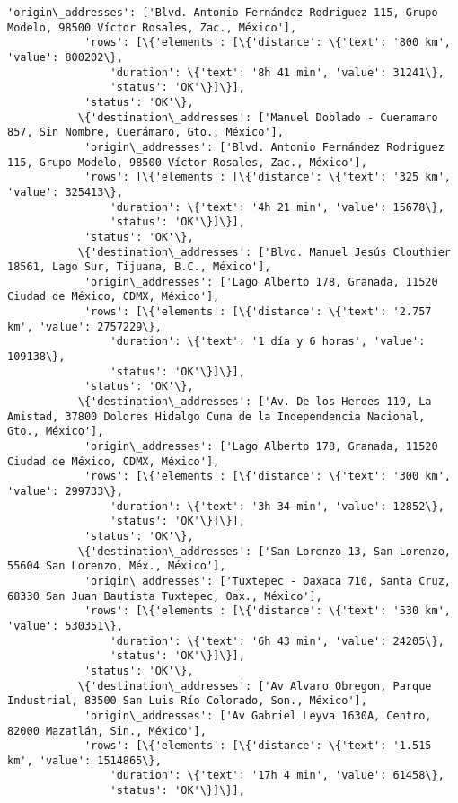 \documentclass[11pt]{article}
\begin{document}
\begin{Verbatim}[commandchars=\\\{\}]
            'origin\_addresses': ['Blvd. Antonio Fernández Rodriguez 115, Grupo Modelo, 98500 Víctor Rosales, Zac., México'],
            'rows': [\{'elements': [\{'distance': \{'text': '800 km', 'value': 800202\},
                'duration': \{'text': '8h 41 min', 'value': 31241\},
                'status': 'OK'\}]\}],
            'status': 'OK'\},
           \{'destination\_addresses': ['Manuel Doblado - Cueramaro 857, Sin Nombre, Cuerámaro, Gto., México'],
            'origin\_addresses': ['Blvd. Antonio Fernández Rodriguez 115, Grupo Modelo, 98500 Víctor Rosales, Zac., México'],
            'rows': [\{'elements': [\{'distance': \{'text': '325 km', 'value': 325413\},
                'duration': \{'text': '4h 21 min', 'value': 15678\},
                'status': 'OK'\}]\}],
            'status': 'OK'\},
           \{'destination\_addresses': ['Blvd. Manuel Jesús Clouthier 18561, Lago Sur, Tijuana, B.C., México'],
            'origin\_addresses': ['Lago Alberto 178, Granada, 11520 Ciudad de México, CDMX, México'],
            'rows': [\{'elements': [\{'distance': \{'text': '2.757 km', 'value': 2757229\},
                'duration': \{'text': '1 día y 6 horas', 'value': 109138\},
                'status': 'OK'\}]\}],
            'status': 'OK'\},
           \{'destination\_addresses': ['Av. De los Heroes 119, La Amistad, 37800 Dolores Hidalgo Cuna de la Independencia Nacional, Gto., México'],
            'origin\_addresses': ['Lago Alberto 178, Granada, 11520 Ciudad de México, CDMX, México'],
            'rows': [\{'elements': [\{'distance': \{'text': '300 km', 'value': 299733\},
                'duration': \{'text': '3h 34 min', 'value': 12852\},
                'status': 'OK'\}]\}],
            'status': 'OK'\},
           \{'destination\_addresses': ['San Lorenzo 13, San Lorenzo, 55604 San Lorenzo, Méx., México'],
            'origin\_addresses': ['Tuxtepec - Oaxaca 710, Santa Cruz, 68330 San Juan Bautista Tuxtepec, Oax., México'],
            'rows': [\{'elements': [\{'distance': \{'text': '530 km', 'value': 530351\},
                'duration': \{'text': '6h 43 min', 'value': 24205\},
                'status': 'OK'\}]\}],
            'status': 'OK'\},
           \{'destination\_addresses': ['Av Alvaro Obregon, Parque Industrial, 83500 San Luis Río Colorado, Son., México'],
            'origin\_addresses': ['Av Gabriel Leyva 1630A, Centro, 82000 Mazatlán, Sin., México'],
            'rows': [\{'elements': [\{'distance': \{'text': '1.515 km', 'value': 1514865\},
                'duration': \{'text': '17h 4 min', 'value': 61458\},
                'status': 'OK'\}]\}],

\end{Verbatim}
\end{document}
